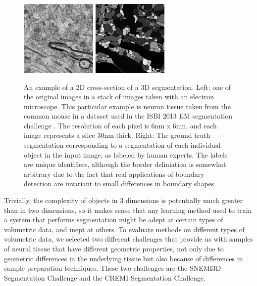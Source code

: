 \begin{figure}[h]
    \centering
	\includegraphics[width=0.33\textwidth]{img/snemi3d_raw_example}
	\hspace{1cm}
	\includegraphics[width=0.33\textwidth]{img/snemi3d_label_example}
    \caption[An example of a 2D cross-section of a 3D segmentation]{An example of a 2D cross-section of a 3D segmentation. Left: one of the original images in a stack of images taken with an electron microscope. This particular example is neuron tissue taken from the common mouse in a dataset used in the ISBI 2013 EM segmentation challenge \cite{Kasthuri2015}. The resolution of each pixel is 6nm x 6nm, and each image represents a slice 30nm thick. Right: The ground truth segmentation corresponding to a segmentation of each individual object in the input image, as labeled by human experts. The labels are unique identifiers, although the border deliniation is somewhat arbitrary due to the fact that real applications of boundary detection are invariant to small differences in boundary shapes.}
    \label{fig:snemi3d_example}
\end{figure}

Trivially, the complexity of objects in 3 dimensions is potentially much greater than in two dimensions, so it makes sense that any learning method used to train a system that performs segmentation might be adept at certain types of volumetric data, and inept at others. To evaluate methods on different types of volumetric data, we selected two different challenges that provide us with samples of neural tissue that have different geometric properties, not only due to geometric differences in the underlying tissue but also because of differences in sample preparation techniques. These two challenges are the SNEMI3D Segmentation Challenge and the CREMI Segmentation Challenge.

